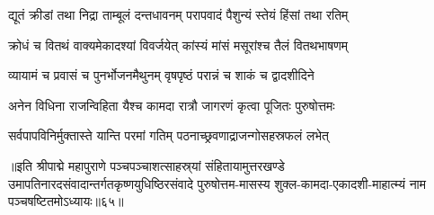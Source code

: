 \twolineshloka
{द्यूतं क्रीडां तथा निद्रा ताम्बूलं दन्तधावनम्}
{परापवादं पैशुन्यं स्तेयं हिंसां तथा रतिम्}%

\twolineshloka
{क्रोधं च वितथं वाक्यमेकादश्यां विवर्जयेत्}
{कांस्यं मांसं मसूरांश्च तैलं वितथभाषणम्}%

\twolineshloka
{व्यायामं च प्रवासं च पुनर्भोजनमैथुनम्}
{वृषपृष्ठं परान्नं च शाकं च द्वादशीदिने}%

\twolineshloka
{अनेन विधिना राजन्विहिता यैश्च कामदा}
{रात्रौ जागरणं कृत्वा पूजितः पुरुषोत्तमः}%

\twolineshloka
{सर्वपापविनिर्मुक्तास्ते यान्ति परमां गतिम्}
{पठनाच्छ्रवणाद्राजन्गोसहस्रफलं लभेत्}%

॥इति श्रीपाद्मे महापुराणे पञ्चपञ्चाशत्साहस्र्यां संहितायामुत्तरखण्डे उमापतिनारदसंवादान्तर्गतकृष्णयुधिष्ठिरसंवादे पुरुषोत्तम-मासस्य शुक्ल-कामदा-एकादशी-माहात्म्यं नाम पञ्चषष्टितमोऽध्यायः॥६५॥

\hyperref[sec:ekadashi_mahatmyam_padma_puranam]{\closesub}